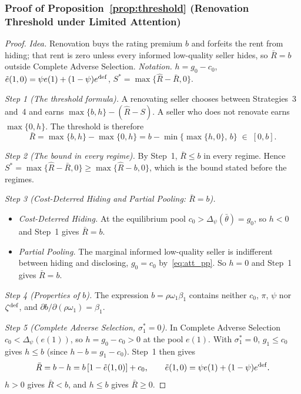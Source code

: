 \subsubsection*{Proof of Proposition~\ref{prop:threshold} (Renovation Threshold under Limited Attention)}

\begin{proof}\upshape
\emph{Idea.} Renovation buys the rating premium $b$ and forfeits the rent from hiding; that rent is zero unless every informed low-quality seller hides, so $\bar R=b$ outside Complete Adverse Selection. \emph{Notation.} $h=g_0-c_0$, $\tilde e(1,0)=\psi e(1)+(1-\psi)e^{\rm def}$, $S^*=\max\{\hat R-\bar R,0\}$.

\emph{Step 1 (The threshold formula).} A renovating seller chooses between Strategies~3 and~4 and earns $\max\{b,h\}-(\hat R-S)$. A seller who does not renovate earns $\max\{0,h\}$. The threshold is therefore
\begin{equation*}
    \bar R=\max\{b,h\}-\max\{0,h\}=b-\min\big\{\max\{h,0\},\,b\big\}\;\in\;[0,b].
\end{equation*}

\emph{Step 2 (The bound in every regime).} By Step~1, $\bar R\le b$ in every regime. Hence $S^*=\max\{\hat R-\bar R,0\}\ge\max\{\hat R-b,0\}$, which is the bound stated before the regimes.

\emph{Step 3 (Cost-Deterred Hiding and Partial Pooling: $\bar R=b$).}
\begin{itemize}
    \item \emph{Cost-Deterred Hiding.} At the equilibrium pool $c_0>\Delta_\psi(\bar\theta)=g_0$, so $h<0$ and Step~1 gives $\bar R=b$.
    \item \emph{Partial Pooling.} The marginal informed low-quality seller is indifferent between hiding and disclosing, $g_0=c_0$ by~\eqref{eq:att_pp}. So $h=0$ and Step~1 gives $\bar R=b$.
\end{itemize}

\emph{Step 4 (Properties of $b$).} The expression $b=\rho\omega_1\beta_1$ contains neither $c_0$, $\pi$, $\psi$ nor $\zeta^{\rm def}$, and $\partial b/\partial(\rho\omega_1)=\beta_1$.

\emph{Step 5 (Complete Adverse Selection, $\sigma_1^*=0$).} In Complete Adverse Selection $c_0<\Delta_\psi(e(1))$, so $h=g_0-c_0>0$ at the pool $e(1)$. With $\sigma_1^*=0$, $g_1\le c_0$ gives $h\le b$ (since $h-b=g_1-c_0$). Step~1 then gives
\begin{equation*}
    \bar R=b-h=b\,[1-\tilde e(1,0)]+c_0,\qquad \tilde e(1,0)=\psi e(1)+(1-\psi)e^{\rm def}.
\end{equation*}
$h>0$ gives $\bar R<b$, and $h\le b$ gives $\bar R\ge0$.


\end{proof}
